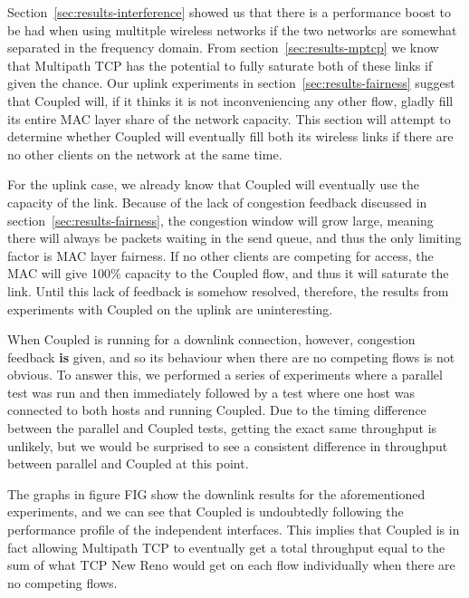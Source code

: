 Section~\ref{sec:results-interference} showed us that there is a performance
boost to be had when using multitple wireless networks if the two networks are
somewhat separated in the frequency domain. From section~\ref{sec:results-mptcp}
we know that Multipath TCP has the potential to fully saturate both of these
links if given the chance. Our uplink experiments in
section~\ref{sec:results-fairness} suggest that Coupled will, if it thinks it is
not inconveniencing any other flow, gladly fill its entire MAC layer share of the
network capacity. This section will attempt to determine whether Coupled will
eventually fill both its wireless links if there are no other clients on the
network at the same time.

For the uplink case, we already know that Coupled will eventually use the
capacity of the link. Because of the lack of congestion feedback discussed in
section~\ref{sec:results-fairness}, the congestion window will grow large,
meaning there will always be packets waiting in the send queue, and thus the
only limiting factor is MAC layer fairness. If no other clients are competing
for access, the MAC will give 100\% capacity to the Coupled flow, and thus it
will saturate the link. Until this lack of feedback is somehow resolved,
therefore, the results from experiments with Coupled on the uplink are
uninteresting.

When Coupled is running for a downlink connection, however, congestion feedback
\textbf{is} given, and so its behaviour when there are no competing flows is
not obvious. To answer this, we performed a series of experiments where a
parallel test was run and then immediately followed by a test where one host was
connected to both hosts and running Coupled. Due to the timing difference
between the parallel and Coupled tests, getting the exact same throughput is
unlikely, but we would be surprised to see a consistent difference in throughput
between parallel and Coupled at this point.

The graphs in figure FIG show the downlink results for the aforementioned
experiments, and we can see that Coupled is undoubtedly following the
performance profile of the independent interfaces. This implies that Coupled is
in fact allowing Multipath TCP to eventually get a total throughput equal to the
sum of what TCP New Reno would get on each flow individually when there are no
competing flows.
